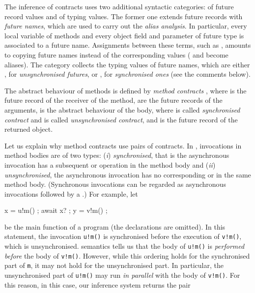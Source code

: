 \medskip

\ifIFM
\else

\medskip

The inference of contracts uses two additional syntactic categories:  of future
record values and  of typing values. The former one extends future records with
\emph{future names}, which are used to carry out the \emph{alias analysis}. 
In particular, every
local variable  of methods and every object field and parameter of future type is 
associated to a future name. Assignments between these terms, such as , amounts 
to copying 
future names instead of the corresponding values ( and  become aliases). 
The category  collects the typing values of future names, which are 
either , for \emph{unsynchronised futures}, or ,
for \emph{synchronised ones}
(see the comments below).

\smallskip

The abstract behaviour of methods is defined by \emph{me\-thod contracts} 
,
where 
 is the future record of the receiver of the method,  are the future records of the arguments,  is the abstract behaviour
 of the body, where  is called 
\emph{synchronised contract} and   is called \emph{unsynchronised contract}, 
 and 
 is the future record of the returned object. 

Let us explain why method contracts  use pairs of contracts. In {\coreABS}, 
invocations in method bodies are of two types: (\emph{i})  \emph{synchronised}, that is
the asynchronous invocation has a subsequent  or  operation in the
method body and  (\emph{ii}) \emph{unsynchronised}, the asynchronous invocation 
has no corresponding   or  in the same method body. (Synchronous
invocations can be regarded as asynchronous invocations followed by a .)
For example, let
\begin{absexamplen}
x = u!m() ;
await x? ;
y = v!m() ;
\end{absexamplen}
be the main function of a program (the declarations are omitted).
In this statement, the invocation {\tt u!m()} is synchronised before the execution
of {\tt v!m()}, which is unsynchronised. {\coreABS} semantics  
tells us that the body
of {\tt u!m()} is \emph{performed before} the body of {\tt v!m()}. However, while
this ordering holds for the synchronised part of {\tt m}, it may not hold
for the unsynchronised part. In particular, the unsynchronised part of {\tt u!m()}
may run \emph{in parallel} with the body of {\tt v!m()}. For this reason, in this case,
our inference system returns the pair

